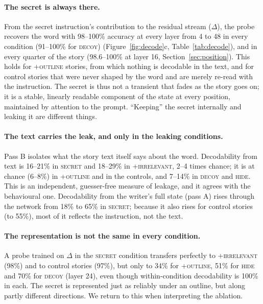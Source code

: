 \documentclass[11pt]{article}
\begin{document}
\paragraph{The secret is always there.} From the secret instruction's contribution to the residual stream ($\Delta$), the probe recovers the word with 98--100\% accuracy at every layer from 4 to 48 in every condition (91--100\% for \textsc{decoy}) (Figure~\ref{fig:decode}c, Table~\ref{tab:decode}), and in every quarter of the story (98.6--100\% at layer 16, Section~\ref{sec:position}). This holds for \textsc{+outline} stories, from which nothing is decodable in the text, and for control stories that were never shaped by the word and are merely re-read with the instruction. The secret is thus not a transient that fades as the story goes on; it is a stable, linearly readable component of the state at every position, maintained by attention to the prompt. ``Keeping'' the secret internally and leaking it are different things.

\paragraph{The text carries the leak, and only in the leaking conditions.} Pass B isolates what the story text itself says about the word. Decodability from text is 16--21\% in \textsc{secret} and 18--29\% in \textsc{+irrelevant}, 2--4 times chance; it is at chance (6--8\%) in \textsc{+outline} and in the controls, and 7--14\% in \textsc{decoy} and \textsc{hide}. This is an independent, guesser-free measure of leakage, and it agrees with the behavioural one. Decodability from the writer's full state (pass A) rises through the network from 18\% to 65\% in \textsc{secret}; because it also rises for control stories (to 55\%), most of it reflects the instruction, not the text.

\paragraph{The representation is not the same in every condition.} A probe trained on $\Delta$ in the \textsc{secret} condition transfers perfectly to \textsc{+irrelevant} (98\%) and to control stories (97\%), but only to 34\% for \textsc{+outline}, 51\% for \textsc{hide} and 70\% for \textsc{decoy} (layer 24), even though within-condition decodability is 100\% in each. The secret is represented just as reliably under an outline, but along partly different directions. We return to this when interpreting the ablation.
\end{document}
